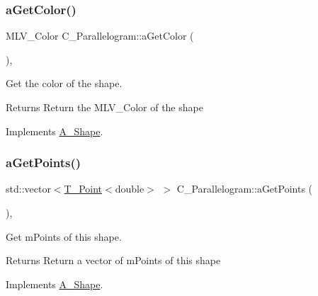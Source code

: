 \subsubsection{\texorpdfstring{a\+Get\+Color()}{aGetColor()}\hspace{0.1cm}{\footnotesize\ttfamily [2/2]}}
{\footnotesize\ttfamily M\+L\+V\+\_\+\+Color C\+\_\+\+Parallelogram\+::a\+Get\+Color (\begin{DoxyParamCaption}{ }\end{DoxyParamCaption})\hspace{0.3cm}{\ttfamily [override]}, {\ttfamily [virtual]}}



Get the color of the shape. 

\begin{DoxyReturn}{Returns}
Return the M\+L\+V\+\_\+\+Color of the shape 
\end{DoxyReturn}


Implements \hyperlink{classA__Shape_a1e90c8132d33e4ac84d42f72606193b2}{A\+\_\+\+Shape}.

\mbox{\label{classC__Parallelogram_a81a9927b24fec7dbe4276ce35aa761cd}} 
\subsubsection{\texorpdfstring{a\+Get\+Points()}{aGetPoints()}\hspace{0.1cm}{\footnotesize\ttfamily [1/2]}}
{\footnotesize\ttfamily std\+::vector$<$\hyperlink{classT__Point}{T\+\_\+\+Point}$<$double$>$ $>$ C\+\_\+\+Parallelogram\+::a\+Get\+Points (\begin{DoxyParamCaption}{ }\end{DoxyParamCaption})\hspace{0.3cm}{\ttfamily [override]}, {\ttfamily [virtual]}}



Get m\+Points of this shape. 

\begin{DoxyReturn}{Returns}
Return a vector of m\+Points of this shape 
\end{DoxyReturn}


Implements \hyperlink{classA__Shape_a9fd1285bd63b1fc88943c9969bf01a5c}{A\+\_\+\+Shape}.

